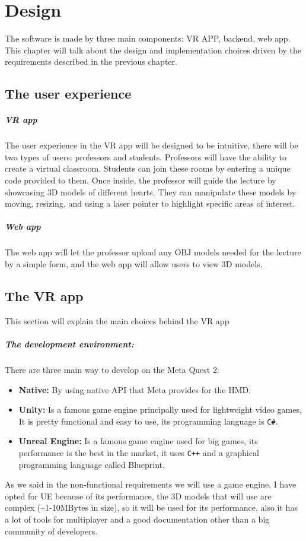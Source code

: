 
\chapter{Design} %
\label{chp:design}
\noindent
The software is made by three main components: \ac{VR} APP, backend, web app. This chapter will talk about the design and implementation choices driven by the requirements described in the previous chapter.
\section{The user experience}
\paragraph{VR app}
The user experience in the \ac{VR} app will be designed to be intuitive, there will be two types of users: professors and students.
Professors will have the ability to create a virtual classroom. Students can join these rooms by entering a unique code provided to them. Once inside, the professor will guide the lecture by showcasing 3D models of different hearts.
They can manipulate these models by moving, resizing, and using a laser pointer to highlight specific areas of interest. 
\paragraph{Web app}
The web app will let the professor upload any OBJ models needed for the lecture by a simple form, and the web app will allow users to view 3D models.

\section{The VR app}
\noindent
This section will explain the main choices behind the \ac{VR} app
\paragraph{The development environment:} 
There are three main way to develop on the Meta Quest 2:

\begin{itemize}
  \item \textbf{Native:} By using native \ac{API} that Meta provides for the \ac{HMD}.
  \item \textbf{Unity:} Is a famous game engine principally used for lightweight video games, It is pretty functional and easy to use, its programming language is \texttt{C\#}. 
  \item \textbf{Unreal Engine:} Is a famous game engine used for big games, its performance is the best in the market, it uses \texttt{C++} and a graphical programming language called Blueprint.
\end{itemize}
\noindent
As we said in the non-functional requirements we will use a game engine, I have opted for \ac{UE} because of its performance, the 3D models that will use are complex (\textasciitilde1-10MBytes in size),
so it will be used for its performance, also it has a lot of tools for multiplayer and a good documentation other than a big community of developers.

